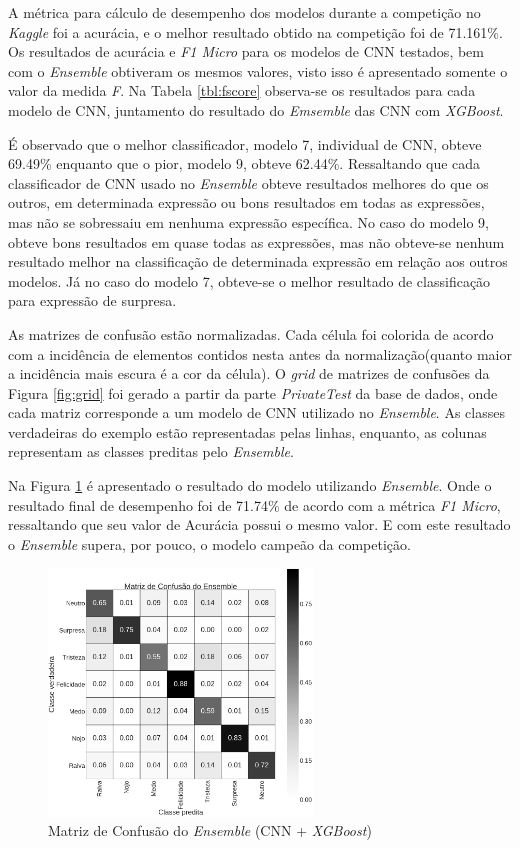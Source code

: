 A métrica para cálculo de desempenho dos modelos durante a competição no \emph{Kaggle} foi a acurácia, e o melhor resultado obtido na competição foi de 71.161\%. Os resultados de acurácia e \emph{F1 Micro} para os modelos de CNN testados, bem com o \emph{Ensemble} obtiveram os mesmos valores, visto isso é apresentado somente o valor da medida \emph{F}. Na Tabela \ref{tbl:fscore} observa-se os resultados para cada modelo de CNN, juntamento do resultado do \emph{Emsemble} das CNN com \emph{XGBoost}.

É observado que o melhor classificador, modelo 7, individual de CNN, obteve 69.49\% enquanto que o pior, modelo 9, obteve 62.44\%. Ressaltando que cada classificador de CNN usado no \emph{Ensemble} obteve resultados melhores do que os outros, em determinada expressão ou bons resultados em todas as expressões, mas não se sobressaiu em nenhuma expressão específica. No caso do modelo 9, obteve bons resultados em quase todas as expressões, mas não obteve-se nenhum resultado melhor na classificação de determinada expressão em relação aos outros modelos. Já no caso do modelo 7, obteve-se o melhor resultado de classificação para expressão de surpresa.



As matrizes de confusão estão normalizadas. Cada célula foi colorida de acordo com a incidência de elementos contidos nesta antes da normalização(quanto maior a incidência mais escura é a cor da célula). O \emph{grid} de matrizes de confusões da Figura \ref{fig:grid} foi gerado a partir da parte \emph{PrivateTest} da base de dados, onde cada matriz corresponde a um modelo de CNN utilizado no \emph{Ensemble}. As classes verdadeiras do exemplo estão representadas pelas linhas, enquanto, as colunas representam as classes preditas pelo \emph{Ensemble}.

Na Figura \ref{fig:emsemble} é apresentado o resultado do modelo utilizando \emph{Ensemble}. Onde o resultado final de desempenho foi de 71.74\% de acordo com a métrica \emph{F1 Micro}, ressaltando que seu valor de Acurácia possui o mesmo valor. E com este resultado o \emph{Ensemble} supera, por pouco, o modelo campeão da competição.

\begin{figure}[!htb]
    \centering
    \includegraphics[width=7cm]{images/cm_emsemble.png}
    \caption{Matriz de Confusão do \emph{Ensemble} (CNN + \emph{XGBoost})}
    \label{fig:emsemble}
\end{figure}
